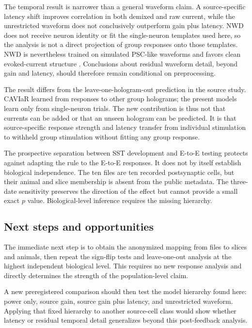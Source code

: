 \documentclass[10pt,twocolumn]{article}
\begin{document}
The temporal result is narrower than a general waveform claim. A
source-specific latency shift improves correlation in both demixed and raw
current, while the unrestricted waveform does not conclusively outperform
gain plus latency. NWD does not receive neuron identity or fit the
single-neuron templates used here, so the analysis is not a direct projection
of group responses onto those templates. NWD is nevertheless trained on
simulated PSC-like waveforms and favors clean evoked-current structure
\citep{triplett2025rapid}. Conclusions about residual waveform detail, beyond
gain and latency, should therefore remain conditional on preprocessing.

The result differs from the leave-one-hologram-out prediction in the source
study. CAVIaR learned from responses to other group holograms; the present
models learn only from single-neuron trials. The new contribution is thus not
that currents can be added or that an unseen hologram can be predicted. It is
that source-specific response strength and latency transfer from individual
stimulation to withheld group stimulation without fitting any group response.

The prospective separation between SST development and E-to-E testing
protects against adapting the rule to the E-to-E responses. It does not by
itself establish biological independence. The ten files are ten recorded
postsynaptic cells, but their animal and slice membership is absent from the
public metadata. The three-date sensitivity preserves the direction of the
effect but cannot provide a small exact $p$ value. Biological-level inference
requires the missing hierarchy.

\subsection{Next steps and opportunities}

The immediate next step is to obtain the anonymized mapping from files to
slices and animals, then repeat the sign-flip tests and leave-one-out analysis
at the highest independent biological level. This requires no new response
analysis and directly determines the strength of the population-level claim.

A new preregistered comparison should then test the model hierarchy found
here: power only, source gain, source gain plus latency, and unrestricted
waveform. Applying that fixed hierarchy to another source-cell class would
show whether latency or residual temporal detail generalizes beyond this
post-feedback analysis.
\end{document}
